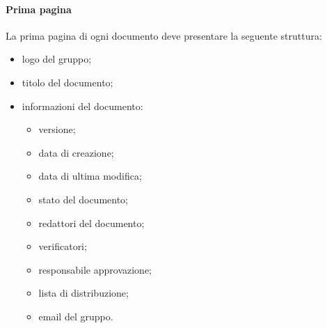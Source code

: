                 \paragraph{Prima pagina}
                La prima pagina di ogni documento deve presentare la seguente struttura:
                \begin{itemize}
                    \item logo del gruppo;
                    \item titolo del documento;
                    \item informazioni del documento:
                    \begin{itemize}
                        \item versione;
                        \item data di creazione;
                        \item data di ultima modifica;
                        \item stato del documento;
                        \item redattori del documento;
                        \item verificatori;
                        \item responsabile approvazione;
                        \item lista di distribuzione;
                        \item email del gruppo.
                    \end{itemize}
                \end{itemize}
